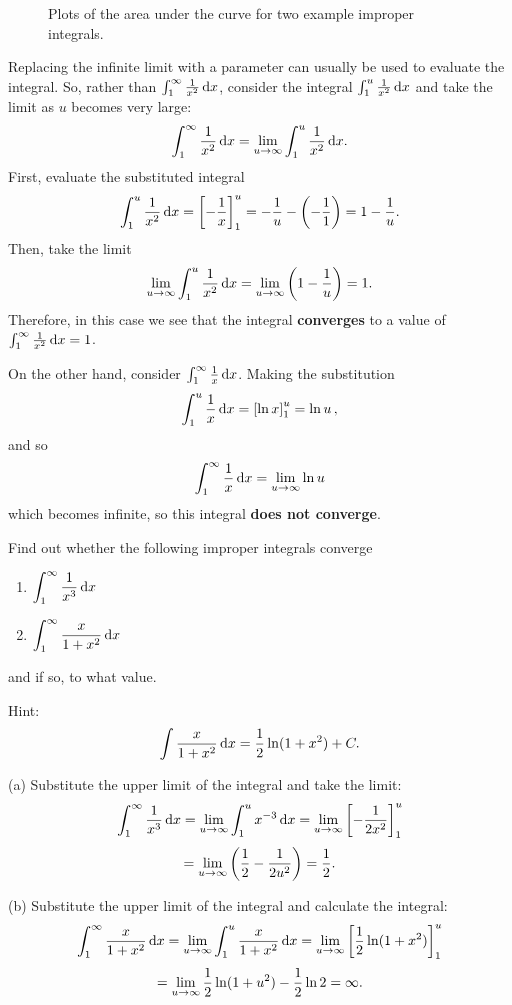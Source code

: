 \begin{figure}[ht]
    \centering
    \hfill
    \caption{Plots of the area under the curve for two example improper integrals.}
    \label{fig:improper_examples}
\end{figure}

Replacing the infinite limit with a parameter can usually be used to evaluate the integral. So, rather than $\int_1^\infty\frac{1}{x^2}\,{\rm d}x$, consider the integral $\int_1^u\frac{1}{x^2}\,{\rm d}x$ and take the limit as $u$ becomes very large:
\[
\int_1^\infty\frac{1}{x^2}\,{\rm d}x = \lim_{u\to\infty}\int_1^u\frac{1}{x^2}\,{\rm d}x.
\]
First, evaluate the substituted integral
\[
\int_1^u\frac{1}{x^2}\,{\rm d}x
=\left[-\frac{1}{x}\right]_1^u
=-\frac{1}{u}-\left(-\frac{1}{1}\right)
=1-\frac{1}{u}.
\]
Then, take the limit
\[
\lim_{u\to\infty}\int_1^u\frac{1}{x^2}\,{\rm d}x
=\lim_{u\to\infty}\left(1-\frac{1}{u}\right)
=1.
\]
Therefore, in this case we see that the integral \textbf{converges} to a value of $\int_1^\infty\frac{1}{x^2}\,{\rm d}x=1$.

On the other hand, consider $\int_1^\infty\frac{1}{x}\,{\rm d}x$. Making the substitution
\[
\int_1^u\frac{1}{x}\,{\rm d}x
=\left[\ln x\right]_1^u
=\ln u \, ,
\]
and so 
\[
\int_1^\infty\frac{1}{x}\,{\rm d}x = \lim_{u\to\infty}\ln u
\]
which becomes infinite, so this integral \textbf{does not converge}.

\begin{example}[Lecture]
Find out whether the following improper integrals converge
\begin{enumerate}
\item[(a)] $\displaystyle\int_1^\infty\frac{1}{x^3}\,{\rm d}x$
\item[(b)] $\displaystyle\int_1^\infty\frac{x}{1+x^2}\,{\rm d}x$
\end{enumerate}
and if so, to what value.

Hint:
\[
\int\frac{x}{1+x^2}\,{\rm d}x=\frac{1}{2}\ln(1+x^2)+C.
\]
\end{example}

\begin{solution}
(a) Substitute the upper limit of the integral and take the limit:
\[
\int_1^\infty\frac{1}{x^3}\,{\rm d}x
=\lim_{u\to\infty}\int_1^u x^{-3}\,{\rm d}x
=\lim_{u\to\infty}\left[-\frac{1}{2x^2}\right]_1^u
\]
\[
=\lim_{u\to\infty}\left(\frac{1}{2}-\frac{1}{2u^2}\right)
=\frac{1}{2}.
\]

(b) Substitute the upper limit of the integral and calculate the integral:
\[
\int_1^\infty\frac{x}{1+x^2}\,{\rm d}x
=\lim_{u\to\infty}\int_1^u\frac{x}{1+x^2}\,{\rm d}x
=\lim_{u\to\infty}\left[\frac{1}{2}\ln(1+x^2)\right]_1^u
\]
\[
=\lim_{u\to\infty}\frac{1}{2}\ln(1+u^2)-\frac{1}{2}\ln2
=\infty.
\]
\end{solution}

